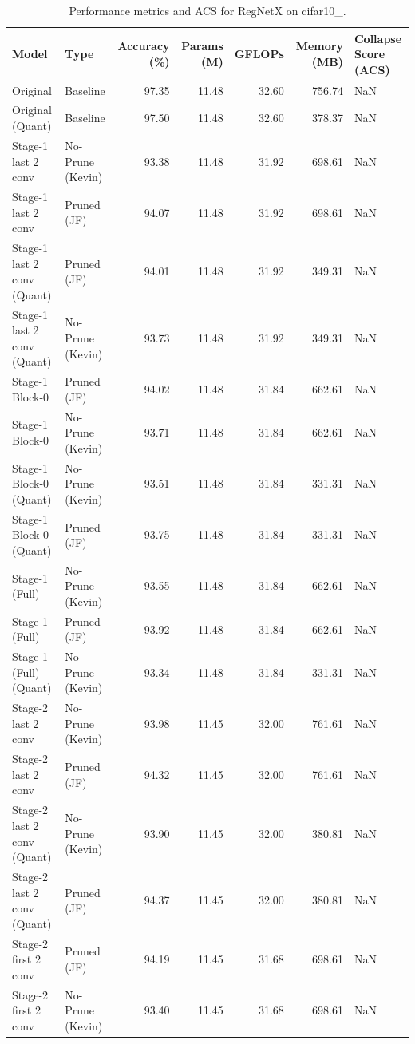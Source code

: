 \begin{table}
\caption{Performance metrics and ACS for RegNetX on cifar10_.}
\label{tab:RegNetX_cifar10_}
\begin{tabular}{llrrrrl}
\toprule
Model & Type & Accuracy (\%) & Params (M) & GFLOPs & Memory (MB) & Collapse Score (ACS) \\
\midrule
Original & Baseline & 97.35 & 11.48 & 32.60 & 756.74 & NaN \\
Original
(Quant) & Baseline & 97.50 & 11.48 & 32.60 & 378.37 & NaN \\
Stage-1 last 2 conv & No-Prune (Kevin) & 93.38 & 11.48 & 31.92 & 698.61 & NaN \\
Stage-1 last 2 conv & Pruned (JF) & 94.07 & 11.48 & 31.92 & 698.61 & NaN \\
Stage-1 last 2 conv
(Quant) & Pruned (JF) & 94.01 & 11.48 & 31.92 & 349.31 & NaN \\
Stage-1 last 2 conv
(Quant) & No-Prune (Kevin) & 93.73 & 11.48 & 31.92 & 349.31 & NaN \\
Stage-1 Block-0 & Pruned (JF) & 94.02 & 11.48 & 31.84 & 662.61 & NaN \\
Stage-1 Block-0 & No-Prune (Kevin) & 93.71 & 11.48 & 31.84 & 662.61 & NaN \\
Stage-1 Block-0
(Quant) & No-Prune (Kevin) & 93.51 & 11.48 & 31.84 & 331.31 & NaN \\
Stage-1 Block-0
(Quant) & Pruned (JF) & 93.75 & 11.48 & 31.84 & 331.31 & NaN \\
Stage-1 (Full) & No-Prune (Kevin) & 93.55 & 11.48 & 31.84 & 662.61 & NaN \\
Stage-1 (Full) & Pruned (JF) & 93.92 & 11.48 & 31.84 & 662.61 & NaN \\
Stage-1 (Full)
(Quant) & No-Prune (Kevin) & 93.34 & 11.48 & 31.84 & 331.31 & NaN \\
Stage-2 last 2 conv & No-Prune (Kevin) & 93.98 & 11.45 & 32.00 & 761.61 & NaN \\
Stage-2 last 2 conv & Pruned (JF) & 94.32 & 11.45 & 32.00 & 761.61 & NaN \\
Stage-2 last 2 conv
(Quant) & No-Prune (Kevin) & 93.90 & 11.45 & 32.00 & 380.81 & NaN \\
Stage-2 last 2 conv
(Quant) & Pruned (JF) & 94.37 & 11.45 & 32.00 & 380.81 & NaN \\
Stage-2 first 2 conv & Pruned (JF) & 94.19 & 11.45 & 31.68 & 698.61 & NaN \\
Stage-2 first 2 conv & No-Prune (Kevin) & 93.40 & 11.45 & 31.68 & 698.61 & NaN \\

\end{tabular}
\end{table}
